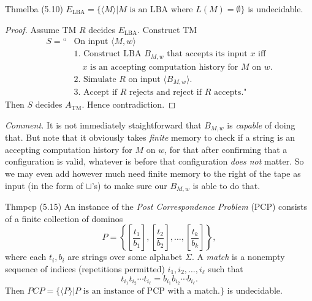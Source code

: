 \begin{reference}{Thm}{elba}
  (5.10) $E_{\mathrm{LBA}}=\{\langle M\rangle|M\text{ is an LBA where }L(M)=\emptyset\}$ is undecidable.
\end{reference}

\begin{proof}
  Assume TM $R$ decides $E_{\mathrm{LBA}}$. Construct TM
  \begin{align*}
    S=\text{``} & \text{On input }\langle M,w\rangle                                          \\
                & \text{1. Construct LBA }B_{M,w}\text{ that accepts its input }x\text{ iff } \\
                & \quad x\text{ is an accepting computation history for }M\text{ on }w.       \\
                & \text{2. Simulate }R\text{ on input }\langle B_{M,w}\rangle.                \\
                & \text{3. Accept if }R\text{ rejects and reject if }R\text{ accepts."}
  \end{align*}
  Then $S$ decides $A_{\mathrm{TM}}$. Hence contradiction.
\end{proof}

\textit{Comment.} It is not immediately staightforward that $B_{M,w}$ is \textit{capable} of doing that. But note that it obviously takes \textit{finite} memory to check if a string is an accepting computation history for $M$ on $w$, for that after confirming that a configuration is valid, whatever is before that configuration \textit{does not} matter. So we may even add however much need finite memory to the right of the tape as input (in the form of $\sqcup$'s) to make sure our $B_{M,w}$ is able to do that.

\begin{reference}{Thm}{pcp}
  (5.15) An instance of the \emph{Post Correspondence Problem} (PCP) consists of a finite collection of dominos
  \[
    P = \left\{ \left[ \frac{t_1}{b_1} \right], \left[ \frac{t_2}{b_2} \right], \dots, \left[ \frac{t_k}{b_k} \right] \right\},
  \]
  where each $t_i, b_i$ are strings over some alphabet $\Sigma$. A \emph{match} is a nonempty sequence of indices (repetitions permitted) $i_1, i_2, \dots, i_\ell$ such that
  \[
    t_{i_1} t_{i_2} \cdots t_{i_\ell} = b_{i_1} b_{i_2} \cdots b_{i_\ell}.
  \]
  Then $PCP=\{\langle P\rangle|P\text{ is an instance of PCP with a match.}\}$ is undecidable.
\end{reference}

